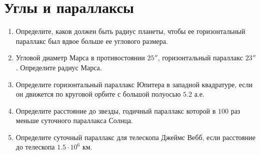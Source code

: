 \documentclass[11pt]{article}
\begin{document}
\section*{Углы и параллаксы}
\begin{enumerate}[resume]
	\item Определите, каков должен быть радиус планеты, чтобы ее горизонтальный параллакс был вдвое больше ее углового размера.
    \item Угловой диаметр Марса в противостоянии $25''$, горизонтальный параллакс $23''$. Определите радиус Марса.
    \item Определите горизонтальный параллакс Юпитера в западной квадратуре, если он движется по круговой орбите с большой полуосью $5.2$ а.е.
    \item Определите расстояние до звезды, годичный параллакс которой в $100$ раз меньше суточного параллакса Солнца.
    \item Определите суточный параллакс для телескопа Джеймс Вебб, если расстояние до телескопа $1.5 \cdot 10^6$ км.
\end{enumerate}
\end{document}
